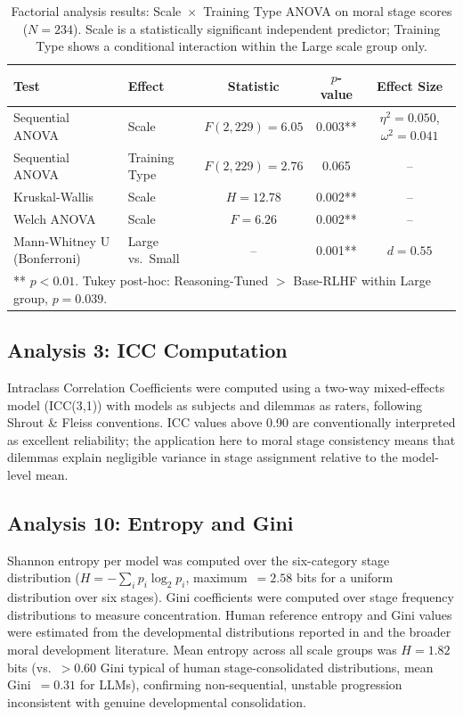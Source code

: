 \documentclass{article}
\begin{document}
\begin{table}[h]
\centering
\caption{Factorial analysis results: Scale~$\times$~Training Type ANOVA on moral stage scores ($N=234$). Scale is a statistically significant independent predictor; Training Type shows a conditional interaction within the Large scale group only.}
\label{tab:anova_results}
\begin{tabular}{llccc}
\toprule
Test & Effect & Statistic & $p$-value & Effect Size \\
\midrule
Sequential ANOVA     & Scale         & $F(2,229)=6.05$ & 0.003** & $\eta^2=0.050$, $\omega^2=0.041$ \\
Sequential ANOVA     & Training Type & $F(2,229)=2.76$ & 0.065   & -- \\
Kruskal-Wallis       & Scale         & $H=12.78$       & 0.002** & -- \\
Welch ANOVA          & Scale         & $F=6.26$        & 0.002** & -- \\
Mann-Whitney U (Bonferroni) & Large vs.\ Small & --   & 0.001** & $d=0.55$ \\
\bottomrule
\multicolumn{5}{l}{\small{** $p<0.01$. Tukey post-hoc: Reasoning-Tuned $>$ Base-RLHF within Large group, $p=0.039$.}}
\end{tabular}
\end{table}

\subsection{Analysis 3: ICC Computation}

Intraclass Correlation Coefficients were computed using a two-way mixed-effects model (ICC(3,1)) with models as subjects and dilemmas as raters, following Shrout \& Fleiss conventions. ICC values above 0.90 are conventionally interpreted as excellent reliability; the application here to moral stage consistency means that dilemmas explain negligible variance in stage assignment relative to the model-level mean.

\subsection{Analysis 10: Entropy and Gini}
\label{app:analysis10}

Shannon entropy per model was computed over the six-category stage distribution ($H = -\sum_i p_i \log_2 p_i$, maximum~$= 2.58$ bits for a uniform distribution over six stages). Gini coefficients were computed over stage frequency distributions to measure concentration. Human reference entropy and Gini values were estimated from the developmental distributions reported in \citet{awad2018moral} and the broader moral development literature. Mean entropy across all scale groups was $H = 1.82$ bits (vs.\ $>$0.60 Gini typical of human stage-consolidated distributions, mean Gini~$= 0.31$ for LLMs), confirming non-sequential, unstable progression inconsistent with genuine developmental consolidation.
\end{document}
